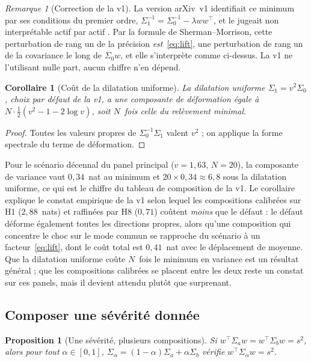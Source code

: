 \documentclass[11pt]{article}
\newtheorem{proposition}{Proposition}
\newtheorem{corollary}{Corollaire}
\theoremstyle{definition}
\theoremstyle{remark}
\newtheorem*{remark}{Remarque}
\begin{document}
\begin{remark}[Correction de la v1]
La version arXiv~v1 identifiait ce minimum par ses conditions du premier ordre,
$\Sigma_1^{-1}=\Sigma_0^{-1}-\lambda ww^\top$, et le jugeait \og non
interprétable actif par actif \fg{}. Par la formule de Sherman--Morrison, cette
perturbation de rang un de la précision \emph{est}~\eqref{eq:lift}, une
perturbation de rang un de la covariance le long de $\Sigma_0w$, et elle
s'interprète comme ci-dessus. La v1 ne l'utilisant nulle part, aucun chiffre
n'en dépend.
\end{remark}

\begin{corollary}[Coût de la dilatation uniforme]
\label{cor:uniform}
La dilatation uniforme $\Sigma_1=v^2\Sigma_0$, choix par défaut de la v1, a une
composante de déformation égale à $N\cdot\tfrac12(v^2-1-2\log v)$, soit $N$~fois
celle du relèvement minimal.
\end{corollary}

\begin{proof}
Toutes les valeurs propres de $\Sigma_0^{-1}\Sigma_1$ valent $v^2$ ; on applique
la forme spectrale du terme de déformation.
\end{proof}

Pour le scénario décennal du panel principal ($v=1{,}63$, $N=20$), la
composante de variance vaut $0{,}34$~nat au minimum et $20\times0{,}34\approx6{,}8$
sous la dilatation uniforme, ce qui est le chiffre du tableau de composition de
la v1. Le corollaire explique le constat empirique de la v1 selon lequel les
compositions calibrées sur H1 ($2{,}88$~nats) et raffinées par H8 ($0{,}71$)
coûtent \emph{moins} que le défaut : le défaut déforme également toutes les
directions propres, alors qu'une composition qui concentre le choc sur le mode
commun se rapproche du scénario à un facteur~\eqref{eq:lift}, dont le coût total
est $0{,}41$~nat avec le déplacement de moyenne. Que la dilatation uniforme
coûte $N$~fois le minimum en variance est un résultat général ; que les
compositions calibrées se placent entre les deux reste un constat sur ces
panels, mais il devient attendu plutôt que surprenant.

\subsection{Composer une sévérité donnée}

\begin{proposition}[Une sévérité, plusieurs compositions]
\label{prop:composition}
Si $w^\top\Sigma_aw=w^\top\Sigma_bw=s^2$, alors pour tout $\alpha\in[0,1]$,
$\Sigma_\alpha=(1-\alpha)\Sigma_a+\alpha\Sigma_b$ vérifie
$w^\top\Sigma_\alpha w=s^2$.
\end{proposition}
\end{document}
